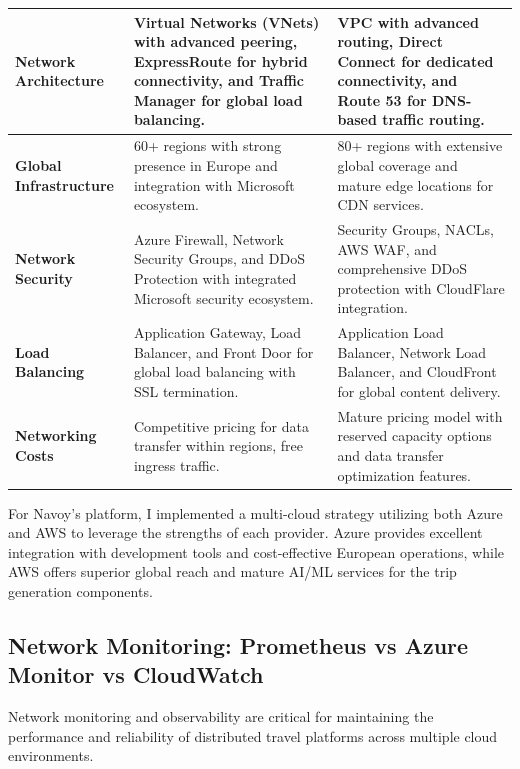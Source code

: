 \begin{longtable}{| p{} | p{} | p{} |}
    \hline
    \endlastfoot

    \textbf{Network Architecture}      & Virtual Networks (VNets) with advanced peering, ExpressRoute for hybrid connectivity, and Traffic Manager for global load balancing. & VPC with advanced routing, Direct Connect for dedicated connectivity, and Route 53 for DNS-based traffic routing. \\
    \hline
    \textbf{Global Infrastructure}     & 60+ regions with strong presence in Europe and integration with Microsoft ecosystem.                                                 & 80+ regions with extensive global coverage and mature edge locations for CDN services.                            \\
    \hline
    \textbf{Network Security}          & Azure Firewall, Network Security Groups, and DDoS Protection with integrated Microsoft security ecosystem.                           & Security Groups, NACLs, AWS WAF, and comprehensive DDoS protection with CloudFlare integration.                   \\
    \hline
    \textbf{Load Balancing}            & Application Gateway, Load Balancer, and Front Door for global load balancing with SSL termination.                                   & Application Load Balancer, Network Load Balancer, and CloudFront for global content delivery.                     \\
    \hline
    \textbf{Networking Costs}          & Competitive pricing for data transfer within regions, free ingress traffic.                                                          & Mature pricing model with reserved capacity options and data transfer optimization features.                      \\
    \hline
\end{longtable}

For Navoy's platform, I implemented a multi-cloud strategy utilizing both Azure and AWS to leverage the strengths of each provider. Azure provides excellent integration with development tools and cost-effective European operations, while AWS offers superior global reach and mature AI/ML services for the trip generation components.

\subsection{Network Monitoring: Prometheus vs Azure Monitor vs CloudWatch}
Network monitoring and observability are critical for maintaining the performance and reliability of distributed travel platforms across multiple cloud environments.

